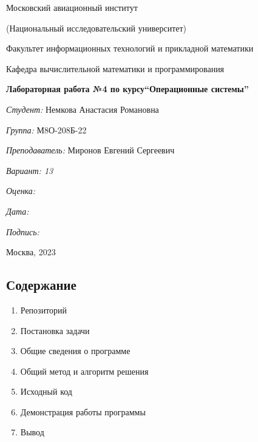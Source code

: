 \documentclass[a4paper, 14pt]{article}
\begin{document}
\thispagestyle{empty}	
\begin{center}
	Московский авиационный институт
	
	(Национальный исследовательский университет)
	
	Факультет информационных технологий и прикладной математики
	
	Кафедра вычислительной математики и программирования
	
\end{center}
\vspace{40ex}
\begin{center}
	\textbf{\large{Лабораторная работа №4 по курсу\linebreak \textquotedblleft Операционные системы\textquotedblright}}
\end{center}
\vspace{35ex}
\begin{flushright}
	\textit{Студент: } Немкова Анастасия Романовна
	
	\vspace{2ex}
	\textit{Группа: } М8О-208Б-22
	
	\vspace{2ex}
	\textit{Преподаватель: } Миронов Евгений Сергеевич
	
	\vspace{2ex}
	\textit{Вариант: 13} 
	
	\vspace{2ex}
	\textit{Оценка: } \underline{\quad\quad\quad\quad\quad\quad}
	
	 \vspace{2ex}
	\textit{Дата: } \underline{\quad\quad\quad\quad\quad\quad}
	
	\vspace{2ex}
	\textit{Подпись: } \underline{\quad\quad\quad\quad\quad\quad}
	
\end{flushright}

\vspace{5ex}

\begin{vfill}
	\begin{center}
		Москва, 2023
	\end{center}	
\end{vfill}
\newpage

\begin{center}
\section*{Содержание}   
\end{center}
\vspace{5ex}
\begin{enumerate}
  \item Репозиторий
  \item Постановка задачи
  \item Общие сведения о программе
  \item Общий метод и алгоритм решения
  \item Исходный код
  \item Демонстрация работы программы
  \item Вывод
\end{enumerate}
\newpage
\end{document}
